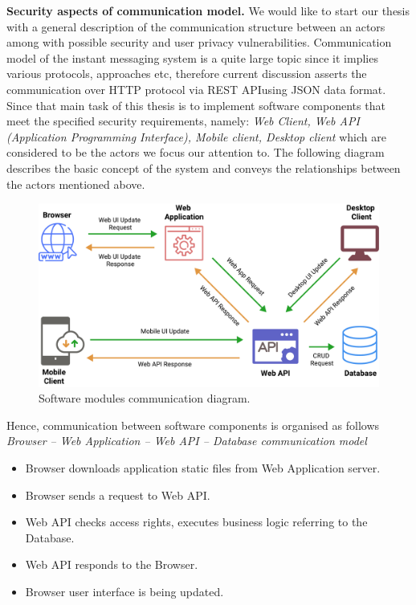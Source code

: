 \textbf{Security aspects of communication model.} We would like to start our thesis with a general description of the
communication structure between an actors among with possible security and user privacy vulnerabilities.
Communication model of the instant messaging system is a quite large topic since it implies various protocols, approaches etc,
therefore current discussion asserts the communication over HTTP protocol via REST API\@ using JSON data format.
Since that main task of this thesis is to implement software components that meet the specified security requirements,
namely: \textit{Web Client, Web API (Application Programming Interface), Mobile client, Desktop client} which are
considered to be the actors we focus our attention to.
The following diagram describes the basic concept of the system and conveys the relationships between the
actors mentioned above.

\begin{figure}[H]
    \centering
    \includegraphics[width=1\textwidth]{Pictures/01_Software_modules_communication_diagram}
    \caption{Software modules communication diagram.}\label{fig:figure6}
\end{figure}

Hence, communication between software components is organised as follows\\

\textit{Browser -- Web Application -- Web API -- Database communication model}
\begin{itemize}
    \item Browser downloads application static files from Web Application server.
    \item Browser sends a request to Web API\@.
    \item Web API checks access rights, executes business logic referring to the Database.
    \item Web API responds to the Browser.
    \item Browser user interface is being updated.
\end{itemize}

